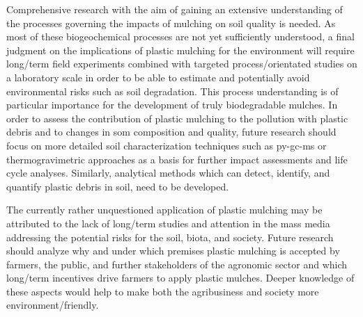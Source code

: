 Comprehensive research with the aim of gaining an extensive understanding of the processes governing the impacts of mulching on soil quality is needed. As most of these biogeochemical processes are not yet sufficiently understood, a final judgment on the implications of plastic mulching for the environment will require long\-/term field experiments combined with targeted process\-/orientated studies on a laboratory scale in order to be able to estimate and potentially avoid environmental risks such as soil degradation. This process understanding is of particular importance for the development of truly biodegradable mulches. In order to assess the contribution of plastic mulching to the pollution with plastic debris and to changes in \ac{som} composition and quality, future research should focus on more detailed soil characterization techniques such as \ac{py-gc-ms} or thermogravimetric approaches as a basis for further impact assessments and life cycle analyses. Similarly, analytical methods which can detect, identify, and quantify plastic debris in soil, need to be developed.

The currently rather unquestioned application of plastic mulching may be attributed to the lack of long\-/term studies and attention in the mass media addressing the potential risks for the soil, biota, and society. Future research should analyze why and under which premises plastic mulching is accepted by farmers, the public, and further stakeholders of the agronomic sector and which long\-/term incentives drive farmers to apply plastic mulches. Deeper knowledge of these aspects would help to make both the agribusiness and society more environment\-/friendly.
